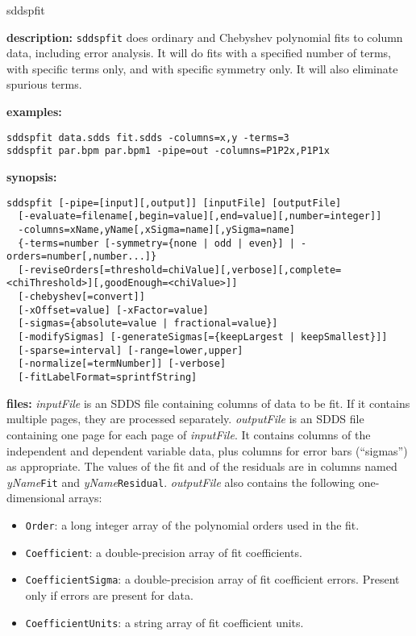 \begin{sddsprog}{sddspfit}
  \item \textbf{description:} \verb|sddspfit| does ordinary and Chebyshev polynomial fits to column data, including error analysis. It will do fits with a specified number of terms, with specific terms only, and with specific symmetry only. It will also eliminate spurious terms.
  \item \textbf{examples:}
  \begin{verbatim}
sddspfit data.sdds fit.sdds -columns=x,y -terms=3
sddspfit par.bpm par.bpm1 -pipe=out -columns=P1P2x,P1P1x
  \end{verbatim}
  \item \textbf{synopsis:}
  \begin{verbatim}
sddspfit [-pipe=[input][,output]] [inputFile] [outputFile]
  [-evaluate=filename[,begin=value][,end=value][,number=integer]]
  -columns=xName,yName[,xSigma=name][,ySigma=name]
  {-terms=number [-symmetry={none | odd | even}] | -orders=number[,number...]}
  [-reviseOrders[=threshold=chiValue][,verbose][,complete=<chiThreshold>][,goodEnough=<chiValue>]]
  [-chebyshev[=convert]]
  [-xOffset=value] [-xFactor=value]
  [-sigmas={absolute=value | fractional=value}]
  [-modifySigmas] [-generateSigmas[={keepLargest | keepSmallest}]]
  [-sparse=interval] [-range=lower,upper]
  [-normalize[=termNumber]] [-verbose]
  [-fitLabelFormat=sprintfString]
  \end{verbatim}
  \item \textbf{files:} \emph{inputFile} is an SDDS file containing columns of data to be fit. If it contains multiple pages, they are processed separately. \emph{outputFile} is an SDDS file containing one page for each page of \emph{inputFile}. It contains columns of the independent and dependent variable data, plus columns for error bars (``sigmas'') as appropriate. The values of the fit and of the residuals are in columns named \emph{yName}\verb|Fit| and \emph{yName}\verb|Residual|. \emph{outputFile} also contains the following one-dimensional arrays:
    \begin{itemize}
      \item \verb|Order|: a long integer array of the polynomial orders used in the fit.
      \item \verb|Coefficient|: a double-precision array of fit coefficients.
      \item \verb|CoefficientSigma|: a double-precision array of fit coefficient errors. Present only if errors are present for data.
      \item \verb|CoefficientUnits|: a string array of fit coefficient units.

\end{itemize}
\end{sddsprog}
